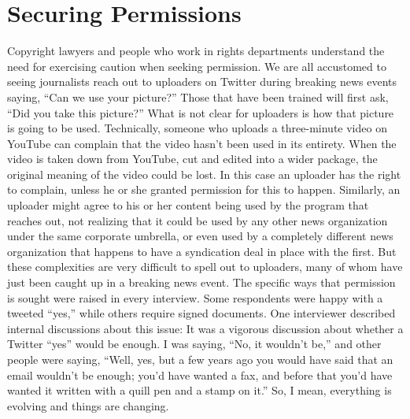 \documentclass[symmetric, notoc, nobib]{towcenter-book}
\begin{document}
\section{Securing Permissions}
Copyright lawyers and people who work in rights departments understand
the need for exercising caution when seeking permission. We are all accustomed
to seeing journalists reach out to uploaders on Twitter during breaking
news events saying, ``Can we use your picture?'' Those that have been
trained will first ask, ``Did you take this picture?''
What is not clear for uploaders is how that picture is going to be used.
Technically, someone who uploads a three-minute video on YouTube can
complain that the video hasn't been used in its entirety. When the video is
taken down from YouTube, cut and edited into a wider package, the original
meaning of the video could be lost. In this case an uploader has the right to
complain, unless he or she granted permission for this to happen. Similarly,
an uploader might agree to his or her content being used by the program
that reaches out, not realizing that it could be used by any other news organization
under the same corporate umbrella, or even used by a completely
different news organization that happens to have a syndication deal in place
with the first. But these complexities are very difficult to spell out to uploaders,
many of whom have just been caught up in a breaking news event.
The specific ways that permission is sought were raised in every interview.
Some respondents were happy with a tweeted ``yes,'' while others require
signed documents. One interviewer described internal discussions about
this issue:
It was a vigorous discussion about whether a Twitter ``yes'' would be
enough. I was saying, ``No, it wouldn't be,'' and other people were saying,
``Well, yes, but a few years ago you would have said that an email
wouldn't be enough; you'd have wanted a fax, and before that you'd
have wanted it written with a quill pen and a stamp on it.'' So, I mean,
everything is evolving and things are changing.
\end{document}
